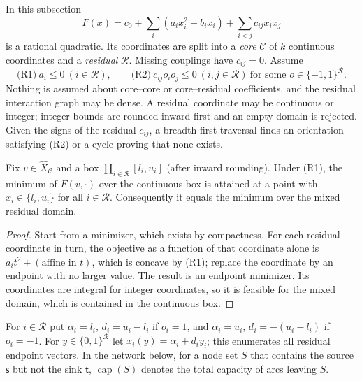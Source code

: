 In this subsection
\[
F(x)=c_0+\sum_i(a_ix_i^2+b_ix_i)+\sum_{i<j}c_{ij}x_ix_j
\]
is a rational quadratic. Its coordinates are split into a \emph{core}
$\mathcal C$ of $k$ continuous coordinates and a \emph{residual}
$\mathcal R$. Missing couplings have $c_{ij}=0$. Assume
\begin{equation}\label{eq:cr-class}
\text{(R1)}\ a_i\le0\ (i\in\mathcal R),\qquad
\text{(R2)}\ c_{ij}o_io_j\le0\ (i,j\in\mathcal R)\ \text{for some }
o\in\{-1,1\}^{\mathcal R}.
\end{equation}
Nothing is assumed about core--core or core--residual coefficients, and
the residual interaction graph may be dense. A residual coordinate may be
continuous or integer; integer bounds are rounded inward first and an
empty domain is rejected. Given the signs of the residual $c_{ij}$, a
breadth-first traversal finds an orientation satisfying (R2) or a cycle
proving that none exists.

\begin{lemma}\label{lem:cr-endpoint}
Fix $v\in\widehat X_{\mathcal C}$ and a box $\prod_{i\in\mathcal R}[l_i,u_i]$
(after inward rounding). Under (R1), the minimum of $F(v,\cdot)$ over the
continuous box is attained at a point with $x_i\in\{l_i,u_i\}$ for all
$i\in\mathcal R$. Consequently it equals the minimum over the mixed
residual domain.
\end{lemma}
\begin{proof}
Start from a minimizer, which exists by compactness. For each residual
coordinate in turn, the objective as a function of that coordinate alone
is $a_it^2+(\text{affine in }t)$, which is concave by (R1); replace the
coordinate by an endpoint with no larger value. The result is an endpoint
minimizer. Its coordinates are integral for integer coordinates, so it is
feasible for the mixed domain, which is contained in the continuous box.
\end{proof}

For $i\in\mathcal R$ put $\alpha_i=l_i$, $d_i=u_i-l_i$ if $o_i=1$, and
$\alpha_i=u_i$, $d_i=-(u_i-l_i)$ if $o_i=-1$. For $y\in\{0,1\}^{\mathcal R}$
let $x_i(y)=\alpha_i+d_iy_i$; this enumerates all residual endpoint
vectors. In the network below, for a node set $S$ that contains the
source $\mathsf s$ but not the sink $\mathsf t$, $\operatorname{cap}(S)$
denotes the total capacity of arcs leaving $S$.

